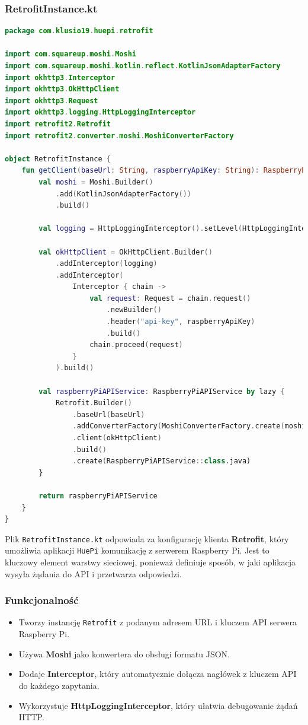 \documentclass[12pt]{article}
\begin{document}
\subsubsection{RetrofitInstance.kt}
\begin{lstlisting}[language=Kotlin]
package com.klusio19.huepi.retrofit

import com.squareup.moshi.Moshi
import com.squareup.moshi.kotlin.reflect.KotlinJsonAdapterFactory
import okhttp3.Interceptor
import okhttp3.OkHttpClient
import okhttp3.Request
import okhttp3.logging.HttpLoggingInterceptor
import retrofit2.Retrofit
import retrofit2.converter.moshi.MoshiConverterFactory

object RetrofitInstance {
    fun getClient(baseUrl: String, raspberryApiKey: String): RaspberryPiAPIService {
        val moshi = Moshi.Builder()
            .add(KotlinJsonAdapterFactory())
            .build()

        val logging = HttpLoggingInterceptor().setLevel(HttpLoggingInterceptor.Level.BODY)

        val okHttpClient = OkHttpClient.Builder()
            .addInterceptor(logging)
            .addInterceptor(
                Interceptor { chain ->
                    val request: Request = chain.request()
                        .newBuilder()
                        .header("api-key", raspberryApiKey)
                        .build()
                    chain.proceed(request)
                }
            ).build()

        val raspberryPiAPIService: RaspberryPiAPIService by lazy {
            Retrofit.Builder()
                .baseUrl(baseUrl)
                .addConverterFactory(MoshiConverterFactory.create(moshi))
                .client(okHttpClient)
                .build()
                .create(RaspberryPiAPIService::class.java)
        }

        return raspberryPiAPIService
    }
}
\end{lstlisting}
Plik \texttt{RetrofitInstance.kt} odpowiada za konfigurację klienta \textbf{Retrofit}, który umożliwia aplikacji \texttt{HuePi} komunikację z serwerem Raspberry Pi. Jest to kluczowy
element warstwy sieciowej, ponieważ definiuje sposób, w jaki aplikacja wysyła żądania do API i przetwarza odpowiedzi.

\subsubsection*{Funkcjonalność}
\begin{itemize}
    \item Tworzy instancję \texttt{Retrofit} z podanym adresem URL i kluczem API serwera Raspberry Pi.
    \item Używa \textbf{Moshi} jako konwertera do obsługi formatu JSON.
    \item Dodaje \textbf{Interceptor}, który automatycznie dołącza nagłówek z kluczem API do każdego zapytania.
    \item Wykorzystuje \textbf{HttpLoggingInterceptor}, który ułatwia debugowanie żądań HTTP.
\end{itemize}
\end{document}
